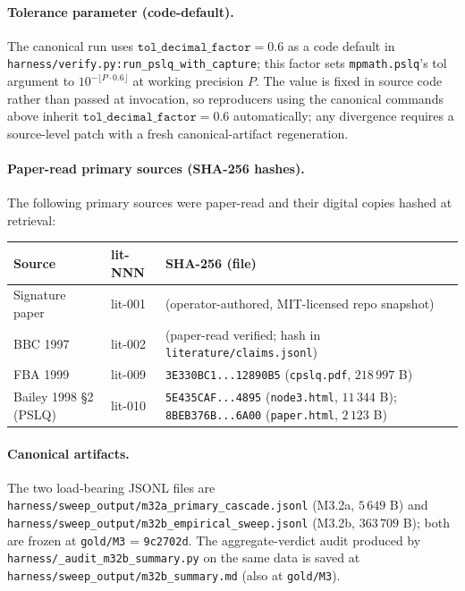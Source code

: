 \documentclass[11pt,a4paper]{article}
\begin{document}
\paragraph{Tolerance parameter (code-default).}
The canonical run uses $\texttt{tol\_decimal\_factor} = 0.6$ as a code
default in \texttt{harness/verify.py:run\_pslq\_with\_capture}; this
factor sets \texttt{mpmath.pslq}'s \textsf{tol} argument to
$10^{-\lfloor P \cdot 0.6 \rfloor}$ at working precision $P$.
The value is fixed in source code rather than passed at invocation,
so reproducers using the canonical commands above inherit
$\texttt{tol\_decimal\_factor} = 0.6$ automatically; any divergence
requires a source-level patch with a fresh canonical-artifact
regeneration.

\paragraph{Paper-read primary sources (SHA-256 hashes).}
The following primary sources were paper-read and their digital copies
hashed at retrieval:

\begin{longtable}{p{} p{} p{}}
\toprule
Source & lit-NNN & SHA-256 (file) \\
\midrule
\endhead
Signature paper \cite{papanokechi2026signature} & lit-001 & (operator-authored, MIT-licensed repo snapshot) \\
BBC 1997 \cite{bbc1997} & lit-002 & (paper-read verified; hash in \texttt{literature/claims.jsonl}) \\
FBA 1999 \cite{fba1999} & lit-009 & \texttt{3E330BC1...12890B5} (\texttt{cpslq.pdf}, $218\,997$ B) \\
Bailey 1998 \S 2 (PSLQ) \cite{bailey1998} & lit-010 & \texttt{5E435CAF...4895} (\texttt{node3.html}, $11\,344$ B); \texttt{8BEB376B...6A00} (\texttt{paper.html}, $2\,123$ B) \\
\bottomrule
\end{longtable}

\paragraph{Canonical artifacts.}
The two load-bearing JSONL files are
\texttt{harness/sweep\_output/m32a\_primary\_cascade.jsonl} (M3.2a, $5\,649$ B)
and
\texttt{harness/sweep\_output/m32b\_empirical\_sweep.jsonl} (M3.2b, $363\,709$ B);
both are frozen at \texttt{gold/M3} = \texttt{9c2702d}.
The aggregate-verdict audit produced by
\texttt{harness/\_audit\_m32b\_summary.py}
on the same data is saved at
\texttt{harness/sweep\_output/m32b\_summary.md}
(also at \texttt{gold/M3}).
\end{document}
